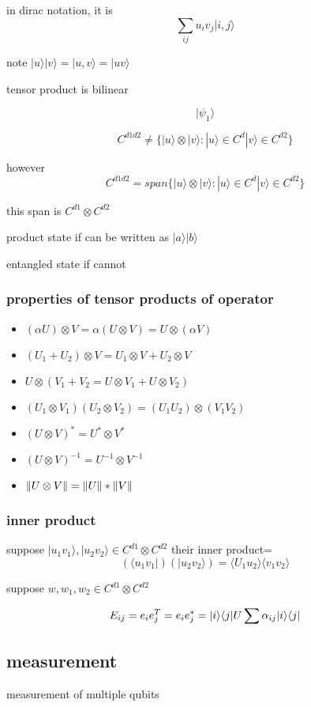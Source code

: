 \documentclass[10pt]{article}
\theoremstyle{break}
\begin{document}
in dirac notation, it is $$\sum_{ij}u_iv_j|i,j\rangle$$

note $|u\rangle|v\rangle = |u,v\rangle=|uv\rangle$

tensor product is bilinear

$$|\psi_1\rangle$$

$$C^{d1d2}\neq\{|u\rangle\otimes|v\rangle: |u\rangle\in C^d 
|v\rangle \in C^{d2}\}$$

however
$$C^{d1d2}=span\{|u\rangle\otimes|v\rangle: |u\rangle\in C^d 
|v\rangle \in C^{d2}\}$$

this span is $C^{d1}\otimes C^{d2}$

product state if can be written as $|a\rangle|b\rangle$

entangled state if cannot 

\subsubsection{properties of tensor products of operator}
\begin{itemize}
    \item $(\alpha U)\otimes V=\alpha(U\otimes V)= U\otimes(\alpha V)$
    \item $(U_1+U_2)\otimes V=U_1 \otimes V+U_2\otimes V$
    \item $U\otimes (V_1+V_2=U\otimes V_1+U\otimes V_2)$
    \item $(U_1\otimes V_1)(U_2 \otimes V_2)=(U_1U_2)\otimes(V_1V_2)$
    \item $(U\otimes V)^*=U^* \otimes V^*$
    \item $(U\otimes V)^{-1}=U^{-1}\otimes V^{-1}$
    \item $\norm{U\otimes V} = \norm{U}*\norm{V}$
\end{itemize}
\subsubsection{inner product}
suppose $|u_1v_1\rangle, |u_2v_2\rangle \in C^{d1} \otimes C^{d2}$
their inner product=$$(\langle u_1v_1|)(|u_2v_2\rangle)=\langle U_1u_2\rangle\langle v_1v_2\rangle$$

suppose $w, w_1, w_2\in C^{d1} \otimes C^{d2}$

$$E_{ij}=e_ie_j^T=e_ie_j^*=|i\rangle\langle j|\\
U\sum\alpha_{ij}|i\rangle\langle j|$$
\subsection{measurement}
measurement of multiple qubits 
\end{document}
